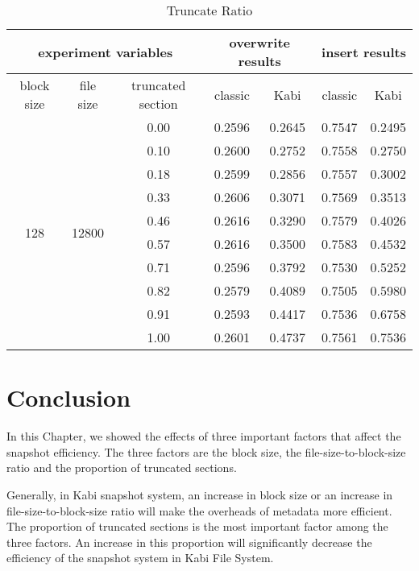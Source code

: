 \begin{table}[t]
\begin{center}
\begin{tabular}{|c|c|c|cccc|}
\hline
\multicolumn{3}{|c|}{experiment variables} & \multicolumn{2}{c|}{overwrite results} & \multicolumn{2}{c|}{insert results}\\
\hline
block size & file size & truncated section & \multicolumn{1}{c|}{classic} & \multicolumn{1}{c|}{Kabi} & \multicolumn{1}{c|}{classic} & Kabi\\
\hline
\multirow{10}{*}{128} & \multirow{10}{*}{12800} & 0.00 & 0.2596 & 0.2645 & 0.7547 & 0.2495 \\
&& 0.10 & 0.2600 & 0.2752 & 0.7558 & 0.2750 \\
&& 0.18 & 0.2599 & 0.2856 & 0.7557 & 0.3002 \\
&& 0.33 & 0.2606 & 0.3071 & 0.7569 & 0.3513 \\
&& 0.46 & 0.2616 & 0.3290 & 0.7579 & 0.4026 \\
&& 0.57 & 0.2616 & 0.3500 & 0.7583 & 0.4532 \\
&& 0.71 & 0.2596 & 0.3792 & 0.7530 & 0.5252 \\
&& 0.82 & 0.2579 & 0.4089 & 0.7505 & 0.5980 \\
&& 0.91 & 0.2593 & 0.4417 & 0.7536 & 0.6758 \\
&& 1.00 & 0.2601 & 0.4737 & 0.7561 & 0.7536 \\
\hline
\end{tabular}
\end{center}
\caption{Truncate Ratio}
\label{tab:truncate_ratio}
\end{table}

\section{Conclusion}

    In this Chapter, we showed the effects of three important factors that affect the snapshot efficiency. The three factors are the block size, the file-size-to-block-size ratio and the proportion of truncated sections.

    Generally, in Kabi snapshot system, an increase in block size or an increase in file-size-to-block-size ratio will make the overheads of metadata more efficient. The proportion of truncated sections is the most important factor among the three factors. An increase in this proportion will significantly decrease the efficiency of the snapshot system in Kabi File System.
